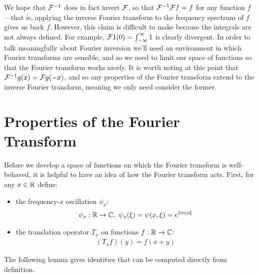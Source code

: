     We hope that $\mathcal{F}^{-1}$ does in fact invert $\mathcal{F}$, so that $\mathcal{F}^{-1}\mathcal{F} f = f$ for any function $f$---that is, applying the inverse Fourier transform to the frequency spectrum of $f$ gives us back $f$.
    However, this claim is difficult to make because the integrals are not always defined.
    For example, $\mathcal{F}1(0)=\int_{-\infty}^\infty1$ is clearly divergent.
    In order to talk meaningfully about Fourier inversion we'll need an environment in which Fourier transforms are sensible, and so we need to limit our space of functions so that the Fourier transform works nicely.
    It is worth noting at this point that $\mathcal{F}^{-1}g(x) = \mathcal{F} g(-x)$, and so any properties of the Fourier transform extend to the inverse Fourier transform, meaning we only need consider the former.

    \section{Properties of the Fourier Transform}
      Before we develop a space of functions on which the Fourier transform is well-behaved, it is helpful to have an idea of how the Fourier transform acts.
      First, for any $x\in\mathbb{R}$ define:
      \begin{itemize}
        \item the frequency-$x$ oscillation $\psi_x$:
          \begin{align*}
            \psi_x:\mathbb{R}\rightarrow\mathbb{C},\ \psi_x(\xi) = \psi(x,\xi) = e^{2\pi i x \xi}
          \end{align*}
        \item the translation operator $T_x$ on functions $f:\mathbb{R}\rightarrow\mathbb{C}$:
          \begin{align*}
            (T_xf)(y) = f(x+y)
          \end{align*}
      \end{itemize}
      The following lemma gives identities that can be computed directly from definition.
